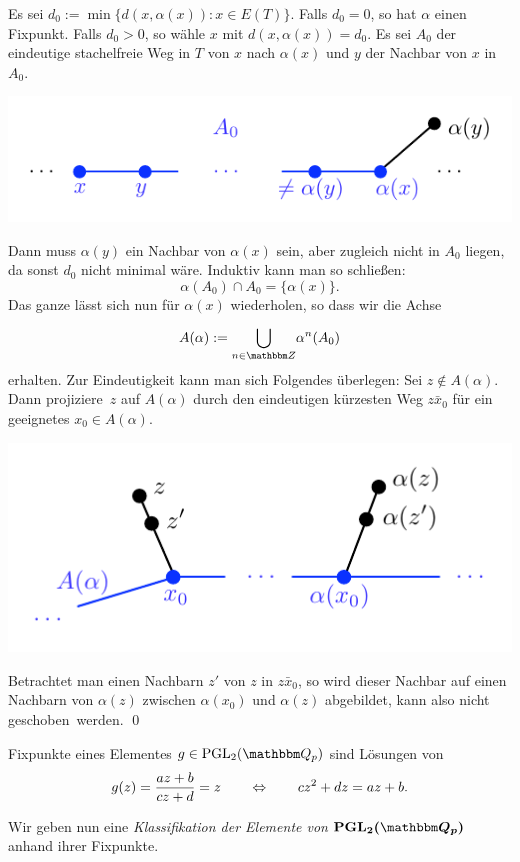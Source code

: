 \documentclass[a4paper, 12pt, twoside]{article}
\begin{document}
\bew Es sei $d_0:=\min\{d(x,\alpha(x)):x\in E(T)\}$. Falls $d_0=0$,
so hat $\alpha$ einen Fixpunkt. Falls $d_0>0$, so wähle $x$ mit
$d(x,\alpha(x))=d_0$. Es sei $A_0$ der eindeutige stachelfreie Weg
in $T$ von $x$ nach $\alpha(x)$ und $y$ der Nachbar von $x$ in $A_0$.
\begin{center}
	\includegraphics{grugraImages/A0}
\end{center}
Dann muss $\alpha(y)$ ein Nachbar von $\alpha(x)$ sein, aber
zugleich nicht in $A_0$ liegen, da sonst $d_0$ nicht minimal wäre.
Induktiv kann man so schließen:
\[
\alpha(A_0) \cap A_0 = \{\alpha(x)\}.
\]
Das ganze lässt sich nun für $\alpha(x)$ wiederholen, so dass wir
die Achse
\[
A(\alpha) := \BCUP{}{n\in\ZZ} \alpha^n(A_0)
\]
erhalten. Zur Eindeutigkeit kann man sich Folgendes überlegen:
Sei $z\not\in A(\alpha)$. Dann \glqq projiziere\grqq\ $z$ auf
$A(\alpha)$ durch den eindeutigen kürzesten Weg $\bar{zx_0}$
für ein geeignetes $x_0\in A(\alpha)$.
\begin{center}
	\includegraphics{grugraImages/Aalpha}
\end{center}
Betrachtet man einen Nachbarn $z'$ von $z$ in $\bar{zx_0}$, so
wird dieser Nachbar auf einen Nachbarn von $\alpha(z)$ zwischen
$\alpha(x_0)$ und $\alpha(z)$ abgebildet, kann also nicht
\glqq geschoben\grqq\ werden.
\qed

Fixpunkte eines Elementes $g\in\PGL_2(\QQ_p)$ sind Lösungen
von
\[
g(z)=\frac{az+b}{cz+d}=z \qquad \Leftrightarrow \qquad
cz^2+dz=az+b.
\]

Wir geben nun eine
\emph{Klassifikation der Elemente von $\boldsymbol{\PGL_2(\QQ_p)}$}
anhand ihrer Fixpunkte.
\end{document}
